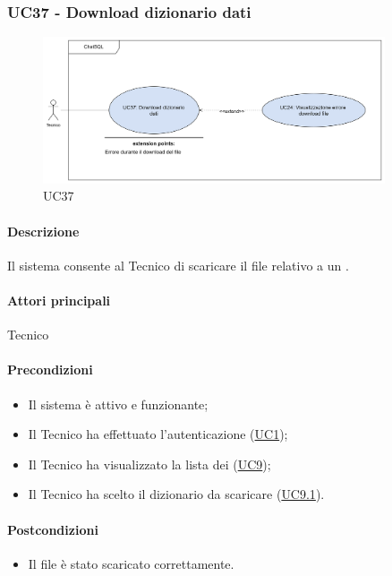 \subsubsection{UC37 - Download dizionario dati}\label{UC37}

\begin{figure}[H]
  \centering
  \includegraphics[width=0.90\textwidth]{assets/uc37.png}
  \caption{UC37}
\end{figure}

\paragraph*{Descrizione}
Il sistema consente al Tecnico di scaricare il file relativo a un .

\paragraph*{Attori principali}
Tecnico

\paragraph*{Precondizioni}
\begin{itemize}
  \item Il sistema è attivo e funzionante;
  \item Il Tecnico ha effettuato l'autenticazione (\hyperref[UC1]{UC1});
  \item Il Tecnico ha visualizzato la lista dei  (\hyperref[UC9]{UC9});
  \item Il Tecnico ha scelto il dizionario da scaricare (\hyperref[UC9.1]{UC9.1}).
\end{itemize}

\paragraph*{Postcondizioni}
\begin{itemize}
  \item Il file è stato scaricato correttamente.
\end{itemize}

